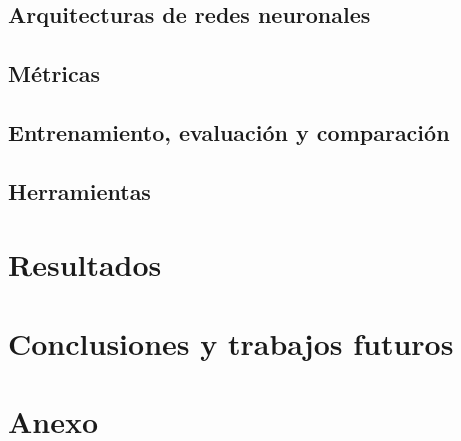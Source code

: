\documentclass[a4paper,12pt,spanish]{book}
\begin{document}
\section{Arquitecturas de redes neuronales}


\section{Métricas} \label{sec:metricas}


\section{Entrenamiento, evaluación y comparación} \label{sec:comparacion}


\section{Herramientas}


\chapter{Resultados} \label{chap:resultados}









\chapter{Conclusiones y trabajos futuros}


\newpage
\footnotesize
\printbibliography[heading=bibintoc]

\chapter*{Anexo}
\label{chap:anexo}


\cleardoublepage
\end{document}
